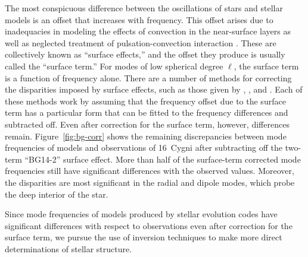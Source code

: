 The most conspicuous difference between the oscillations of stars and stellar models is an offset that increases with frequency. This offset arises due to inadequacies in modeling the effects of convection in the near-surface layers \citep[see, e.g.,][]{1984srps.conf...11C} as well as neglected treatment of pulsation-convection interaction \citep{2017MNRAS.464L.124H}. 
These are collectively known as ``surface effects,'' and the offset they produce is usually called the ``surface term.'' 
For modes of low spherical degree $\ell$, the surface term is a function of frequency alone. 
There are a number of methods for correcting the disparities imposed by surface effects, such as those given by \citet{2008ApJ...683L.175K}, \citet[][hereinafter BG14]{2014A&A...568A.123B}, and \citet{2015A&A...583A.112S}. 
Each of these methods work by assuming that the frequency offset due to the surface term has a particular form that can be fitted to the frequency differences and subtracted off. 
Even after correction for the surface term, however, differences remain. 
Figure~\ref{fig:bg-corr} shows the remaining discrepancies between mode frequencies of models and observations of 16~Cygni after subtracting off the two-term ``BG14-2'' surface effect. 
More than half of the surface-term corrected mode frequencies still have significant differences with the observed values. 
Moreover, the disparities are most significant in the radial and dipole modes, which probe the deep interior of the star. 


Since mode frequencies of models produced by stellar evolution codes have significant differences with respect to observations even after correction for the surface term, we pursue the use of inversion techniques to make more direct determinations of stellar structure. 


